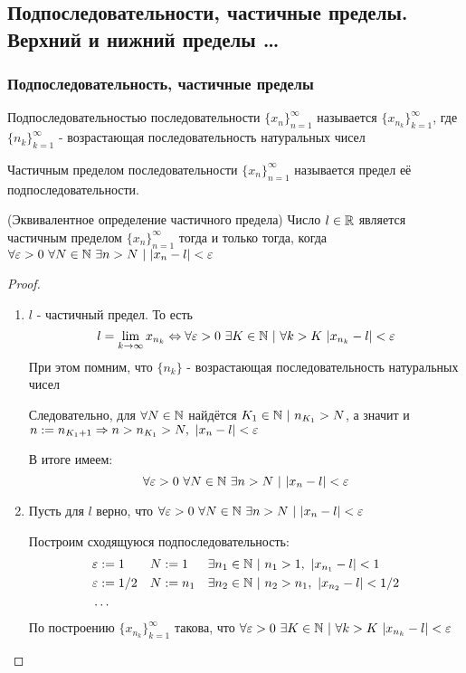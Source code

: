 \subsection{Подпоследовательности, частичные пределы. Верхний и нижний пределы \dots} %
\subsubsection{Подпоследовательность, частичные пределы}
\begin{definition}
	Подпоследовательностью последовательности $\{x_n\}_{n = 1}^\infty$ называется $\{x_{n_k}\}_{k = 1}^\infty$, где $\{n_k\}_{k = 1}^\infty$ - возрастающая последовательность натуральных чисел
\end{definition}

\begin{definition}
	Частичным пределом последовательности $\{x_n\}_{n = 1}^\infty$ называется предел её подпоследовательности.
\end{definition}

\begin{theorem} (Эквивалентное определение частичного предела)
	Число $l \in \mathbb{R}$ является частичным пределом $\{x_n\}_{n = 1}^\infty$ тогда и только тогда, когда $\forall \varepsilon > 0\ \forall N \in \mathbb{N}\ \exists n > N\ |\ |x_n - l| < \varepsilon$
\end{theorem}

\begin{proof}
\begin{enumerate}
	\item $l$ - частичный предел. То есть 
	$$
		l = \liml_{k \to \infty} x_{n_k} \lra \forall \eps > 0\ \exists K \in \N\ |\ \forall k > K\ |x_{n_k} - l| < \eps
	$$
	При этом помним, что $\{n_k\}$ - возрастающая последовательность натуральных чисел
	
	Следовательно, для $\forall N \in \mathbb{N}$ найдётся $K_1 \in \mathbb{N}\ |\ n_{K_1} > N$, а значит и $n := n_{K_1 + 1} \Rightarrow n > n_{K_1} > N,\ |x_n - l| < \varepsilon$
	
	В итоге имеем:
	$$
		\forall \eps > 0\ \forall N \in \N\ \exists n > N\ |\ |x_n - l| < \eps
	$$
	\item Пусть для $l$ верно, что $\forall \varepsilon > 0\ \forall N \in \mathbb{N}\ \exists n > N\ |\ |x_n - l| < \varepsilon$
	
	Построим сходящуюся подпоследовательность:
	\begin{align*}
		&\eps := 1 & &N := 1 & &\exists n_1 \in \N\ |\ n_1 > 1,\ |x_{n_1} - l| < 1
		\\
		&\eps := 1/2 & &N := n_1 & &\exists n_2 \in \N\ |\ n_2 > n_1,\ |x_{n_2} - l| < 1/2
		\\
		&\dots
	\end{align*}
	По построению $\{x_{n_k}\}_{k = 1}^\infty$ такова, что
	$\forall \varepsilon > 0\ \exists K \in \mathbb{N}\ |\ \forall k > K\ |x_{n_k} - l| < \varepsilon$
\end{enumerate}
\end{proof}

